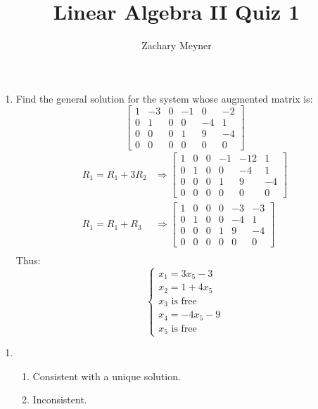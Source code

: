\documentclass[12pt]{article}
\title{\large Linear Algebra II Quiz 1}
\author{\large Zachary Meyner}
\date{}
\begin{document}
\maketitle

\begin{enumerate}[label=\textbf{1.2.13.}]
    \item Find the general solution for the system whose augmented matrix is:
    \[
    \begin{bmatrix}
        1 & -3 & 0 & -1 & 0 & -2 \\
        0 & 1 & 0 & 0 & -4 & 1 \\
        0 & 0 & 0 & 1 & 9 & -4 \\
        0 & 0 & 0 & 0 & 0 & 0
    \end{bmatrix}
    \]
    \begin{align*}
        R_1=R_1 + 3R_2 &\Rightarrow 
        \begin{bmatrix}
            1 & 0 & 0 & -1 & -12 & 1 \\
            0 & 1 & 0 & 0 & -4 & 1 \\
            0 & 0 & 0 & 1 & 9 & -4 \\
            0 & 0 & 0 & 0 & 0 & 0
        \end{bmatrix} \\
        R_1=R_1 + R_3 &\Rightarrow 
        \begin{bmatrix}
            1 & 0 & 0 & 0 & -3 & -3 \\
            0 & 1 & 0 & 0 & -4 & 1 \\
            0 & 0 & 0 & 1 & 9 & -4 \\
            0 & 0 & 0 & 0 & 0 & 0
        \end{bmatrix} \\
    \end{align*}
    Thus:
    \[
    \begin{cases}
        x_1 = 3x_5 - 3 \\
        x_2= 1 + 4x_5 \\
        x_3 \text{ is free} \\
        x_4 = -4x_5 - 9 \\
        x_5 \text{ is free}
    \end{cases}
    \]
\end{enumerate}
\begin{enumerate}[label=\textbf{1.2.19.}]
    \item \begin{enumerate}[label=\alph*.]
        \item Consistent with a unique solution.
        \item Inconsistent.
    \end{enumerate}
\end{enumerate}
\end{document}
